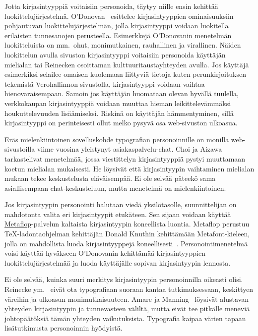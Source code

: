 \documentclass[finnish, 12pt, a4paper, elec, utf8, a-1b, online]{aaltothesis}
\begin{document}
Jotta kirjasintyyppiä voitaisiin personoida, täytyy niille ensin kehittää
luokittelujärjestelmä. O'Donovan~\cite{odonovan_2015} esittelee kirjasintyyppien
ominaisuuksiin pohjautuvan luokittelujärjestelmän, jolla kirjasintyyppi voidaan
luokitella erilaisten tunnesanojen perusteella. Esimerkkejä O'Donovanin
menetelmän luokitteluista on mm.~ohut, monimutkainen, rauhallinen ja virallinen.
Näiden luokittelun avulla sivuston kirjasintyyppi voitaisiin personoida
käyttäjän mielialan tai Reinecken osoittaman kulttuuritaustayhteyden avulla. Jos
käyttäjä esimerkiksi selailee omaisen kuolemaan liittyviä tietoja kuten
perunkirjoituksen tekemistä Verohallinnon sivustolla, kirjasintyyppi voidaan
vaihtaa hienovaraisempaan. Samoin jos käyttäjän huomataan olevan hyvällä
tuulella, verkkokaupan kirjasintyyppiä voidaan muuttaa hieman leikittelevämmäksi
houkuttelevuuden lisäämiseksi. Riskinä on käyttäjän hämmentyminen, sillä
kirjasintyyppi on perinteisesti ollut melko pysyvä osa web-sivuston ulkoasua.

Eräs mielenkiintoinen sovelluskohde typografian personoinnille on monilla
web-sivustoilla viime vuosina yleistynyt asiakaspalvelu-chat. Choi ja
Aizawa~\cite{choi_aizawa_2018} tarkastelivat menetelmää, jossa viestittelyn
kirjasintyyppiä pystyi muuttamaan koetun mielialan mukaisesti. He löysivät että
kirjasintyypin vaihtaminen mielialan mukaan tekee keskustelusta eläväisempää. Ei
ole selvää päteekö sama asiallisempaan chat-keskusteluun, mutta menetelmä on
mielenkiintoinen.

Jos kirjasintyypin personointi halutaan viedä yksilötasolle, suunnittelijan on
mahdotonta valita eri kirjasintyypit etukäteen. Sen sijaan voidaan käyttää
\href{https://www.metaflop.com/}{Metaflop}-palvelun kaltaista kirjasintyypin
koneellista luontia. Metaflop perustuu TeX-ladontaohjelman kehittäjän Donald
Knuthin kehittämään Metafont-kieleen, jolla on mahdollista luoda
kirjasintyyppejä koneellisesti~\cite{knuth_1986}. Personointimenetelmä voisi
käyttää hyväkseen O'Donovanin kehittämää kirjasintyyppien luokittelujärjestelmää
ja luoda käyttäjälle sopivan kirjasintyypin lennosta.

Ei ole selvää, kuinka suuri merkitys kirjasintyypin personoinnilla oikeasti
olisi. Reinecke ym.~\cite{10.1145/2556288.2557052} eivät ota typografiaan
suoraan kantaa tutkimuksessaan, keskittyen väreihin ja ulkoasun
monimutkaisuuteen. Amare ja Manning~\cite{10.1109/IPCC.2012.6408605} löysivät
alustavan yhteyden kirjasintyypin ja tunnevasteen väliltä, mutta eivät tee
pitkälle meneviä johtopäätöksiä tämän yhteyden vaikutuksista. Typografia kaipaa
värien tapaan lisätutkimusta personoinnin hyödyistä.
\end{document}
